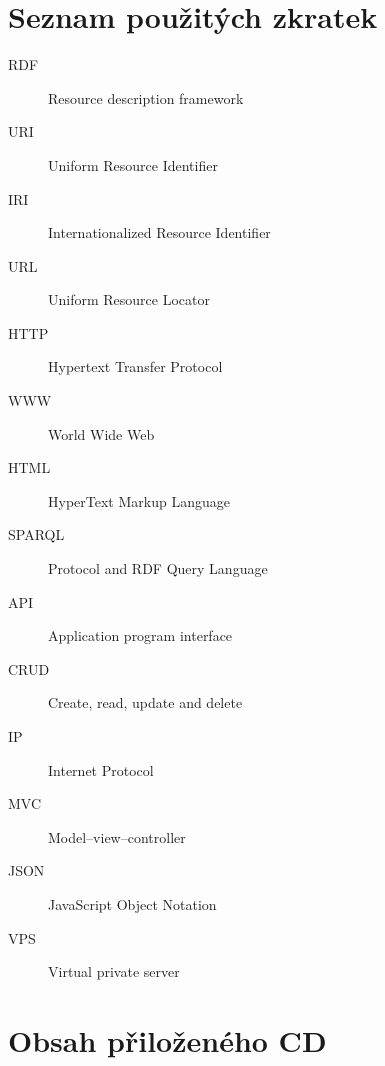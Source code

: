 \documentclass[thesis=B,czech]{FITthesis}[2012/06/26]
\begin{document}
\chapter{Seznam použitých zkratek}
\begin{description}
	\item[RDF] Resource description framework
	\item[URI] Uniform Resource Identifier
	\item[IRI] Internationalized Resource Identifier
	\item[URL] Uniform Resource Locator
	\item[HTTP] Hypertext Transfer Protocol
	\item[WWW] World Wide Web
	\item[HTML] HyperText Markup Language
	\item[SPARQL] Protocol and RDF Query Language
	\item[API] Application program interface
	\item[CRUD] Create, read, update and delete
	\item[IP] Internet Protocol 
	\item[MVC] Model–view–controller
	\item[JSON] JavaScript Object Notation
	\item[VPS] Virtual private server
\end{description}



\chapter{Obsah přiloženého CD}
\begin{figure}[H]
\end{figure}
\end{document}
